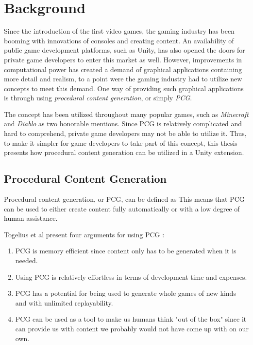 \section{Background}%
Since the introduction of the first video games, the gaming industry has been booming with innovations of consoles and creating content. An availability of public game development platforms, such as Unity, has also opened the doors for private game developers to enter this market as well. However, improvements in computational power has created a demand of graphical applications containing more detail and realism, to a point were the gaming industry had to utilize new concepts to meet this demand. One way of providing such graphical applications is through using \textit{procedural content generation}, or simply \textit{PCG}. 

The concept has been utilized throughout many popular games, such as \textit{Minecraft} and \textit{Diablo} as two honorable mentions. Since PCG is relatively complicated and hard to comprehend, private game developers may not be able to utilize it. Thus, to make it simpler for game developers to take part of this concept, this thesis presents how procedural content generation can be utilized in a Unity extension.


\subsection{Procedural Content Generation}
Procedural content generation, or PCG, can be defined as  \cite[p. 1]{shaker2016procedural} This means that PCG can be used to either create content fully automatically or with a low degree of human assistance.

Togelius et al present four arguments for using PCG \cite[pp. 141-142]{search-based_pcg}:
\begin{enumerate}
    \item PCG is memory efficient since content only has to be generated when it is needed.
    \item Using PCG is relatively effortless in terms of development time and expenses.
    \item PCG has a potential for being used to generate whole games of new kinds and with unlimited replayability.
    \item PCG can be used as a tool to make us humans think "out of the box" since it can provide us with content we probably would not have come up with on our own.
\end{enumerate}
 
